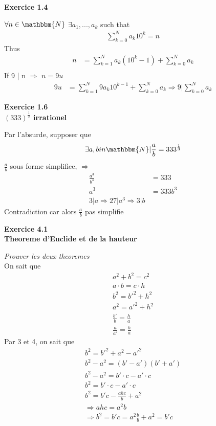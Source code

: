 \documentclass[../main.tex]{subfiles}
\begin{document}



\begin{center}
	\textbf{Exercice 1.4\\}
\end{center}
$\forall n \in \mathbbm{N} $
$ \exists a_1 ,..., a_k $  such that 
\begin{align*}
\sum_{k=0}^{N}a_k 10^{k} = n
\end{align*}
Thus
\begin{align*}
	n &= \sum_{k=1}^{N} a_k (10^{k}-1) + \sum_{k=0}^{N} a_k\\
\end{align*}
If 9 | n $\Rightarrow$ $ n = 9u$ 
\begin{align*}
	9u &= \sum_{k=1}^{N} 9 a_k 10^{k-1} + \sum_{k=0}^{N}a_k \Rightarrow 9 | \sum_{k=0}^{N} a_k	
\end{align*}
\begin{center}
\textbf{Exercice 1.6\\
$ (333)^{\frac{1}{3}}$ irrationel}
\end{center}
Par l'absurde, supposer que
\[ 
\exists a,b in \mathbbm{N} | \frac{a}{b} = 333^{\frac{1}{3}}
\]
$\frac{a}{b}$ sous forme simplifiee, $\Rightarrow$ \\
\begin{align*}
	\frac{a^3}{b^3} &= 333\\
	a^3 &= 333 b^3\\
	3 | a \Rightarrow 27 | a^3 \Rightarrow 3 | b
\end{align*}
\contra
Contradiction car alors $\frac{a}{b}$ pas simplifie
\begin{center}
\textbf{Exercice 4.1\\
Theoreme d'Euclide et de la hauteur}
\end{center}
\textit{Prouver les deux theoremes}\\
On sait que
\begin{align}
a^{2} + b^{2} = c^{2}\\
a \cdot b  = c \cdot h\\
b^{2} = b'^{2} + h^{2}\\
a^{2} = a'^{2} + h^{2}\\
\frac{b'}{b} = \frac{h}{a}\\
\frac{a}{a'} = \frac{h}{a}
\end{align}
Par 3 et 4, on sait que
\begin{align*}
b^{2} = b'^{2} + a^{2} - a'^{2}\\
b^{2} - a^{2}= (b'-a')(b'+a')\\
b^{2} -a^{2} = b'\cdot c - a' \cdot c\\
b^{2} = b' \cdot c - a' \cdot c\\
b^{2} = b' c - \frac{ahc}{b} + a^{2}\\
\Rightarrow ahc = a^{2}b\\
\Rightarrow b^{2} = b'c = a^{2}\frac{b}{b} + a^{2} = b'c
\end{align*}
\end{document}

